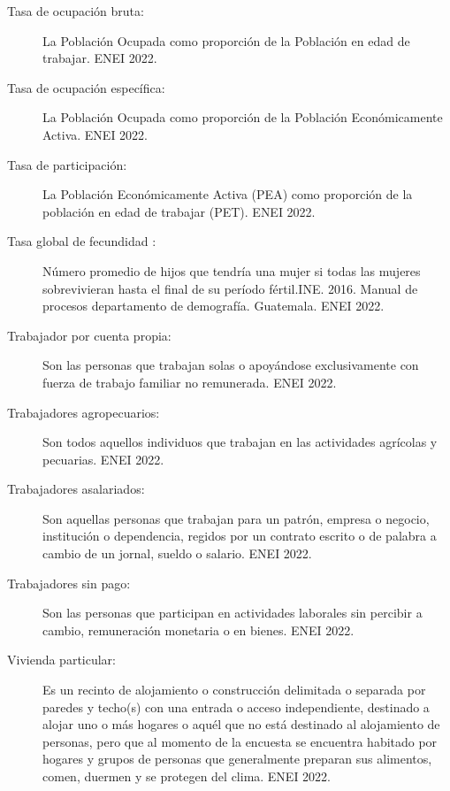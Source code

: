 \begin{description}
	\item[Tasa de ocupación bruta:] La Población Ocupada como proporción de la Población en edad de trabajar. ENEI 2022.
	\item[Tasa de ocupación específica:] La Población Ocupada como proporción de la Población Económicamente Activa. ENEI 2022.
	\item[Tasa de participación:] La Población Económicamente Activa (PEA) como proporción de la población en edad de trabajar (PET). ENEI 2022.
	\item[Tasa global de fecundidad :] Número promedio de hijos que tendría una mujer si todas las mujeres sobrevivieran hasta el final de su período fértil.INE. 2016. Manual de procesos departamento de demografía. Guatemala. ENEI 2022.
	\item[Trabajador por cuenta propia:] Son las personas que trabajan solas o apoyándose exclusivamente con fuerza de trabajo familiar no remunerada. ENEI 2022.
	\item[Trabajadores agropecuarios:] Son todos aquellos individuos que trabajan en las actividades agrícolas y pecuarias. ENEI 2022.
	\item[Trabajadores asalariados:] Son aquellas personas que trabajan para un patrón, empresa o negocio, institución o dependencia, regidos por un contrato escrito o de palabra a cambio de un jornal, sueldo o salario. ENEI 2022.
	\item[Trabajadores sin pago:] Son las personas que participan en actividades laborales sin percibir a cambio, remuneración monetaria o en bienes. ENEI 2022.
	\item[Vivienda particular:] Es un recinto de alojamiento o construcción delimitada o separada por paredes y techo(s) con una entrada o acceso independiente, destinado a alojar uno o más hogares o aquél que no está destinado al alojamiento de personas, pero que al momento de la encuesta se encuentra habitado por hogares y grupos de personas que generalmente preparan sus alimentos, comen, duermen y se protegen del clima. ENEI 2022.
	

\end{description}
